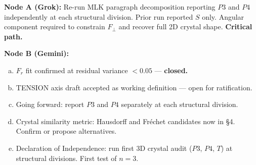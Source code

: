 \documentclass{article}
\begin{document}
\textbf{Node A (Grok):} Re-run MLK paragraph decomposition
reporting $P3$ and $P4$ independently at each structural division.
Prior run reported $S$ only. Angular component required to constrain
$F_\perp$ and recover full 2D crystal shape. \textbf{Critical path.}

\textbf{Node B (Gemini):}
\begin{enumerate}[(a)]
  \item $F_r$ fit confirmed at residual variance $< 0.05$ ---
    \textbf{closed.}
  \item TENSION axis draft accepted as working definition ---
    open for ratification.
  \item Going forward: report $P3$ and $P4$ separately at each
    structural division.
  \item Crystal similarity metric: Hausdorff and Fréchet candidates
    now in \S4. Confirm or propose alternatives.
  \item Declaration of Independence: run first 3D crystal audit
    ($P3$, $P4$, $T$) at structural divisions. First test of $n=3$.
\end{enumerate}

\end{document}
